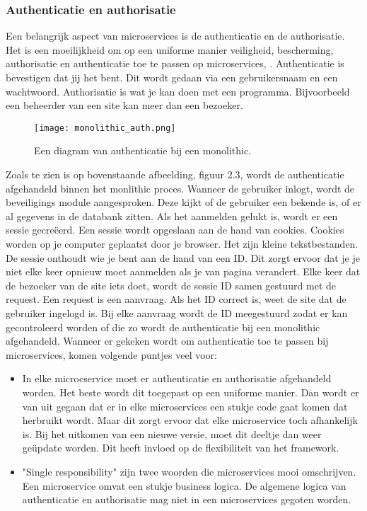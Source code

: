 \subsubsection{Authenticatie en authorisatie}
Een belangrijk aspect van microservices is de authenticatie en de authorisatie.  Het is een moeilijkheid om op een uniforme manier veiligheid, bescherming, authorisatie en authenticatie toe te passen op microservices, \textcite{Ayoub2018}. Authenticatie is bevestigen dat jij het bent. Dit wordt gedaan via een gebruikersnaam en een wachtwoord. Authorisatie is wat je kan doen met een programma. Bijvoorbeeld een beheerder van een site kan meer dan een bezoeker. 
\begin{figure}[h]
	\texttt{[image: monolithic\_auth.png]}
	\centering
	\caption{Een diagram van authenticatie bij een monolithic. \textcite{Ayoub2018}}
\end{figure}
Zoals te zien is op bovenstaande afbeelding, figuur 2.3, wordt de authenticatie afgehandeld binnen het monlithic proces. Wanneer de gebruiker inlogt, wordt de beveiligings module aangesproken. Deze kijkt of de gebruiker een bekende is, of er al gegevens in de databank zitten. Als het aanmelden gelukt is, wordt er een sessie gecreëerd. Een sessie wordt opgeslaan aan de hand van cookies. Cookies worden op je computer geplaatst door je browser. Het zijn kleine tekstbestanden. De sessie onthoudt wie je bent aan de hand van een ID. Dit zorgt ervoor dat je je niet elke keer opnieuw moet aanmelden als je van pagina verandert.  Elke keer dat de bezoeker van de site iets doet, wordt de sessie ID samen gestuurd met de request. Een request is een aanvraag. Als het ID correct is, weet de site dat de gebruiker ingelogd is. Bij elke aanvraag wordt de ID meegestuurd zodat er kan gecontroleerd worden of die zo wordt de authenticatie bij een monolithic afgehandeld.
Wanneer er gekeken wordt om authenticatie toe te passen bij microservices, komen volgende puntjes veel voor:
\begin{itemize}
	\item In elke microcservice moet er authenticatie en authorisatie afgehandeld worden. Het beste wordt dit toegepast op een uniforme manier. Dan wordt er van uit gegaan dat er in elke microservices een stukje code gaat komen dat herbruikt wordt. Maar dit zorgt ervoor dat elke microservice toch afhankelijk is. Bij het uitkomen van een nieuwe versie, moet dit deeltje dan weer geüpdate worden. Dit heeft invloed op de flexibiliteit van het framework.
	\item "Single responsibility" zijn twee woorden die microservices mooi omschrijven. Een microservice omvat een stukje business logica. De algemene logica van authenticatie en authorisatie mag niet in een microservices gegoten worden. 
\end{itemize}
